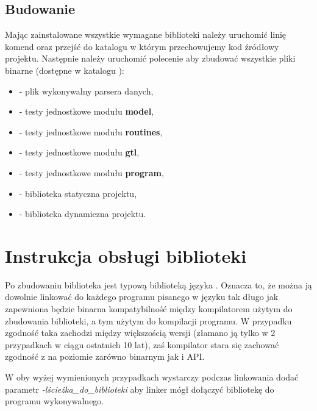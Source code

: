 \documentclass{standalone}
\begin{document}
\section{Budowanie}

Mając zainstalowane wszystkie wymagane biblioteki należy uruchomić linię komend oraz przejść do katalogu w którym
przechowujemy kod źródłowy projektu. Następnie należy uruchomić polecenie  aby zbudować wszystkie
pliki binarne (dostępne w katalogu \CODE{\\bin}):
\begin{itemize}
\item {} - plik wykonywalny parsera danych,
\item {} - testy jednostkowe modułu \textbf{model},
\item {} - testy jednostkowe modułu \textbf{routines},
\item {} - testy jednostkowe modułu \textbf{gtl},
\item {} - testy jednostkowe modułu \textbf{program},
\item {} - biblioteka statyczna projektu,
\item {} - biblioteka dynamiczna projektu.
\end{itemize}

\chapter{Instrukcja obsługi biblioteki}

Po zbudowaniu biblioteka jest typową biblioteką języka . Oznacza to, że można ją dowolnie linkować
do każdego programu pisanego w języku  tak długo jak zapewniona będzie binarna kompatybilność między
kompilatorem użytym do zbudowania biblioteki, a tym użytym do kompilacji programu. W przypadku 
zgodność taka zachodzi między większością wersji (złamano ją tylko w 2 przypadkach w ciągu ostatnich 10 lat),
zaś kompilator  stara się zachować zgodność z  na poziomie zarówno binarnym jak i API. 

W oby wyżej wymienionych przypadkach wystarczy podczas linkowania dodać parametr \textit{-lścieżka\_do\_biblioteki}
aby linker mógł dołączyć bibliotekę do programu wykonywalnego.
\end{document}
